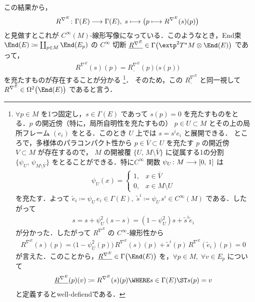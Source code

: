 \documentclass[TQFT_main]{subfiles}
\begin{document}
この結果から，
\begin{align}
    R^{\nabla^E} \colon \Gamma(E) \longrightarrow \Gamma(E),\; s \longmapsto \bigl(p \longmapsto R^{\nabla^E}(s)(p)\bigr)
\end{align}
と見做すとこれが $C^\infty(M)$-線形写像になっている．このようなとき，End束 $\End(E) \coloneqq \coprod_{p \in M} \End (E_p)$ の $C^\infty$ 切断
$\underline{R^{\nabla^E}} \in \Gamma \bigl( \extp^2 T^* M \otimes  \End(E) \bigr)$ 
であって，
\begin{align}
    R^{\nabla^E} (s) (p) = \underline{R^{\nabla^E}}(p) \bigl( s(p) \bigr) 
\end{align}
を充たすものが存在することが分かる
\footnote{
    $\forall p \in M$ を1つ固定し，$s \in \Gamma(E)$ であって $s(p) = 0$ を充たすものをとる．$p$ の開近傍（特に，局所自明性を充たすもの） $p \in U \subset M$ とその上の局所フレーム $(e_i)$ をとる．このとき $U$ 上では $s = s^i e_i$ と展開できる．
    ところで，多様体のパラコンパクト性から $p \in \overline{V} \subset U$ を充たす $p$ の開近傍 $V \subset M$ が存在するので，
    $M$ の開被覆 $\{U,\, M \setminus \overline{V}\}$ に従属する1の分割 $\{\psi_U,\, \psi_{M \setminus \overline{V}}\}$ をとることができる．特に$C^\infty$ 関数 $\psi_U \colon M \longrightarrow [0,\, 1]$ は 
    \begin{align}
        \psi_U(x) = 
        \begin{cases}
            1, &x \in \overline{V} \\ 
            0, &x \in M \setminus U
        \end{cases}
    \end{align}
    を充たす．よって $\tilde{e}_i \coloneqq \psi_U\, e_i \in \Gamma(E),\; \tilde{s}^i \coloneqq \psi_U\, s^i \in C^\infty(M)$ である．したがって
    \begin{align}
        s = s + \psi_U^2 (s-s) = (1-\psi_U^2) s + \tilde{s}^i \tilde{e}_i
    \end{align}
    が分かった．したがって $R^{\nabla^E}$ の $C^\infty$-線形性から
    \begin{align}
        R^{\nabla^E} (s)(p) = \bigl(1-\psi_U^2(p)\bigr)\, R^{\nabla^E}(s)(p) + \tilde{s}^i(p)\, R^{\nabla^E}(\tilde{e}_i)(p) = 0
    \end{align}
    が言えた．このことから，$\underline{R^{\nabla^E}} \in \Gamma \bigl( \End (E) \bigr)$ を，$\forall p \in M,\; \forall v \in E_p$ について
    \begin{align}
        \underline{R^{\nabla^E}}(p)(v) \coloneqq R^{\nabla^E} (s)(p) \WHERE s \in \Gamma(E) \ST s(p) = v
    \end{align}
    と定義するとwell-defiendである．
}．
そのため，この $\underline{R^{\nabla^E}}$ と同一視して $R^{\nabla^E} \in \Omega^2 \bigl( \End(E) \bigr)$ であると言う．
\end{document}
